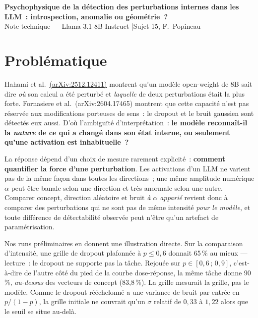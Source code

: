 \documentclass[a4paper,10pt]{article}
\newcommand{\pc}[1]{#1\,\%}
\begin{document}
\begin{center}
  {\large\bfseries Psychophysique de la détection des perturbations internes dans les LLM~:
   introspection, anomalie ou géométrie~?}\\[0.4ex]
  {\small Note technique --- Llama-3.1-8B-Instruct \quad|\quad Sujet 15, F.~Popineau}
\end{center}

\section{Problématique}

Hahami et al.~\href{https://arxiv.org/abs/2512.12411}{\NoAutoSpacing(arXiv:2512.12411)} montrent qu'un modèle
open-weight de 8B sait dire \emph{où} son calcul a été perturbé et \emph{laquelle} de deux
perturbations était la plus forte. Fornasiere et al.~({\NoAutoSpacing arXiv:2604.17465}) montrent que cette capacité
n'est pas réservée aux modifications porteuses de sens~: le dropout et le bruit gaussien sont
détectés eux aussi. D'où l'ambiguïté d'interprétation~: \textbf{le modèle reconnaît-il la
\emph{nature} de ce qui a changé dans son état interne, ou seulement qu'une activation est
inhabituelle~?}

La réponse dépend d'un choix de mesure rarement explicité~: \textbf{comment quantifier la \og force\fg{}
d'une perturbation}. Les activations d'un LLM ne varient pas de la même façon dans toutes les
directions~; une même amplitude numérique $\alpha$ peut être banale selon une direction et très
anormale selon une autre. Comparer concept, direction aléatoire et bruit \emph{à $\alpha$ apparié}
revient donc à comparer des perturbations qui ne sont pas de même intensité \emph{pour le modèle},
et toute différence de détectabilité observée peut n'être qu'un artefact de paramétrisation.

Nos runs préliminaires en donnent une illustration directe. Sur la comparaison d'intensité, une
grille de dropout plafonnée à $p \leq 0{,}6$ donnait \pc{65} au mieux --- lecture~: \og le dropout ne
supporte pas la tâche\fg{}. Rejouée sur $p \in [0{,}6\,;\,0{,}9]$, c'est-à-dire de l'autre côté du pied
de la courbe dose-réponse, la même tâche donne \pc{90}, \emph{au-dessus} des vecteurs de concept
(\pc{83,8}). La grille mesurait la grille, pas le modèle. Comme le dropout rééchelonné a une
variance de bruit par entrée en $p/(1-p)$, la grille initiale ne couvrait qu'un $\sigma$ relatif de
$0{,}33$ à $1{,}22$ alors que le seuil se situe au-delà.
\end{document}
